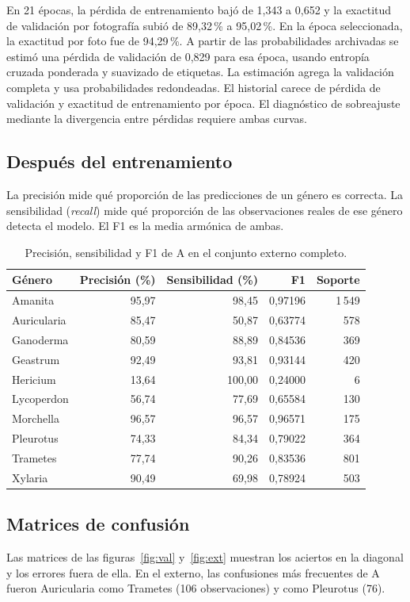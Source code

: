 \documentclass[11pt,a4paper]{article}
\begin{document}
En 21 épocas, la pérdida de entrenamiento bajó de 1,343 a 0,652 y la
exactitud de validación por fotografía subió de 89,32\,\% a 95,02\,\%.
En la época seleccionada, la exactitud por foto fue de 94,29\,\%. A partir
de las probabilidades archivadas se estimó una pérdida de validación de
0,829 para esa época, usando entropía cruzada ponderada y suavizado de
etiquetas. La estimación agrega la validación completa y usa probabilidades
redondeadas. El historial carece de pérdida de validación y exactitud de
entrenamiento por época. El diagnóstico de sobreajuste mediante la divergencia
entre pérdidas requiere ambas curvas.

\subsection{Después del entrenamiento}
La precisión mide qué proporción de las predicciones de un género es correcta.
La sensibilidad (\emph{recall}) mide qué proporción de las observaciones reales
de ese género detecta el modelo. El F1 es la media armónica de ambas.
\begin{table}[H]
\centering
\caption{Precisión, sensibilidad y F1 de A en el conjunto externo completo.}
\label{tab:genera}
\begin{tabular}{lrrrr}
\toprule
Género & Precisión (\%) & Sensibilidad (\%) & F1 & Soporte \\
\midrule
Amanita & 95,97 & 98,45 & 0,97196 & 1\,549 \\
Auricularia & 85,47 & 50,87 & 0,63774 & 578 \\
Ganoderma & 80,59 & 88,89 & 0,84536 & 369 \\
Geastrum & 92,49 & 93,81 & 0,93144 & 420 \\
Hericium & 13,64 & 100,00 & 0,24000 & 6 \\
Lycoperdon & 56,74 & 77,69 & 0,65584 & 130 \\
Morchella & 96,57 & 96,57 & 0,96571 & 175 \\
Pleurotus & 74,33 & 84,34 & 0,79022 & 364 \\
Trametes & 77,74 & 90,26 & 0,83536 & 801 \\
Xylaria & 90,49 & 69,98 & 0,78924 & 503 \\
\bottomrule
\end{tabular}
\end{table}

\clearpage
\subsection{Matrices de confusión}
Las matrices de las figuras~\ref{fig:val} y~\ref{fig:ext} muestran los aciertos
en la diagonal y los errores fuera de ella. En el externo, las confusiones más
frecuentes de A fueron Auricularia como Trametes (106 observaciones) y como
Pleurotus (76).
\end{document}

